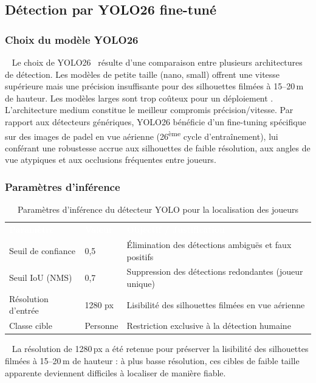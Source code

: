 \subsection{Détection par YOLO26 fine-tuné}
\subsubsection{Choix du modèle YOLO26}
 
Le choix de YOLO26~\cite{yolo_v26} résulte d'une comparaison entre plusieurs
architectures de détection.
Les modèles de petite taille (nano, small) offrent une vitesse
supérieure mais une précision insuffisante pour des silhouettes filmées
à 15--20\,m de hauteur.
Les modèles larges sont trop coûteux pour un déploiement  .
L'architecture medium constitue le meilleur compromis
précision/vitesse.
Par rapport aux détecteurs génériques, YOLO26 bénéficie d'un
fine-tuning spécifique sur des images de padel en vue aérienne
(26\textsuperscript{ème} cycle d'entraînement), lui conférant une
robustesse accrue aux silhouettes de faible résolution, aux angles de
vue atypiques et aux occlusions fréquentes entre joueurs.
 

\subsubsection{Paramètres d'inférence}

\begin{table}[H]
  \centering
  \renewcommand{\arraystretch}{1.3}
  \begin{tabularx}{\textwidth}{L{4cm} C{3cm} X}
    \textcolor{white}{\textbf{Paramètre}} &
    \textcolor{white}{\textbf{Valeur}} &
    \textcolor{white}{\textbf{Objectif / Justification}} \\
    Seuil de confiance & 0,5 & Élimination des détections ambiguës et faux positifs \\
    Seuil IoU (NMS) & 0,7 & Suppression des détections redondantes (joueur unique) \\
    Résolution d'entrée & 1280 px & Lisibilité des silhouettes filmées en vue aérienne \\
    Classe cible & Personne & Restriction exclusive à la détection humaine \\
  \end{tabularx}
  \caption{Paramètres d'inférence du détecteur YOLO pour la localisation des joueurs}
  \label{tab:yolo_params}
\end{table}
 
La résolution de 1280\,px a été retenue pour préserver la lisibilité des
silhouettes filmées à 15--20\,m de hauteur : à plus basse résolution, ces
cibles de faible taille apparente deviennent difficiles à localiser de
manière fiable.
 
